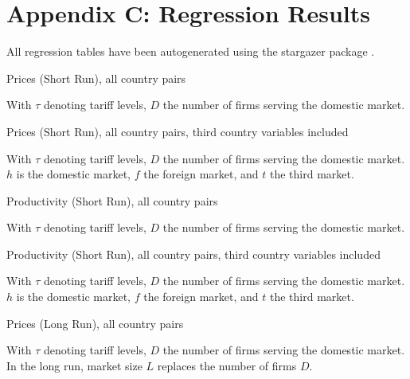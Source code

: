\section{Appendix C: Regression Results}
All regression tables have been autogenerated using the stargazer package \citep{Hlavac2014}.

\begin{table}[h!b]
\tiny
\begin{center}\caption{Prices (Short Run), all country pairs\label{tb:prices_sr}}

\end{center}
\end{table}
With $\tau$ denoting tariff levels, $D$ the number of firms serving the domestic market.
\clearpage

\begin{table}[h!b]
\tiny
\begin{center}\caption{Prices (Short Run), all country pairs, third country 
variables included\label{tb:prices_sr_third}}

\end{center}
\end{table}
With $\tau$ denoting tariff levels, $D$ the number of firms serving the domestic market. 
$h$ is the domestic market, $f$ the foreign market, and $t$ the third market.

\clearpage

\begin{table}[h!b]
\tiny
\begin{center} \caption{Productivity (Short Run), all country pairs\label{tb:productivity_sr}}

\end{center}
\end{table}
With $\tau$ denoting tariff levels, $D$ the number of firms serving the domestic market. 
\clearpage

\begin{table}[h!b]
\tiny
\begin{center} \caption{Productivity (Short Run), all country pairs, third country 
variables included\label{tb:productivity_sr_third}}

\end{center}
\end{table}
With $\tau$ denoting tariff levels, $D$ the number of firms serving the domestic market. 
$h$ is the domestic market, $f$ the foreign market, and $t$ the third market.
\clearpage

\begin{table}[h!b]
\tiny
\begin{center}\caption{Prices (Long Run), all country pairs\label{tb:prices_lr}}

\end{center}
\end{table}
With $\tau$ denoting tariff levels, $D$ the number of firms serving the domestic market. 
In the long run, market size $L$ replaces the number of firms $D$.
\clearpage

